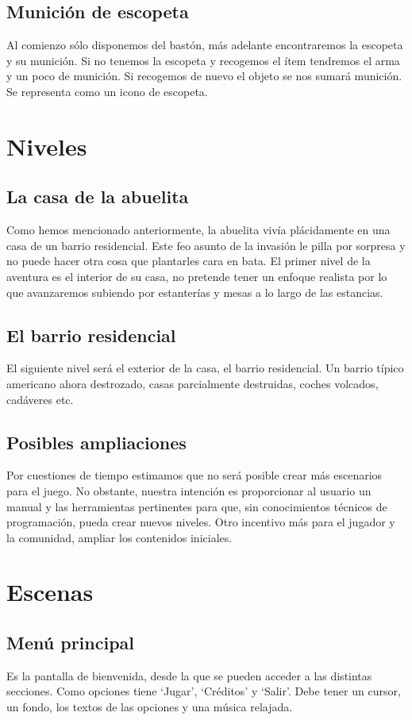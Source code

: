 \documentclass[titlepage]{article}
\begin{document}
\subsection{Munición de escopeta}
Al comienzo sólo disponemos del bastón, más adelante encontraremos la escopeta y su munición. Si no tenemos la escopeta y recogemos el ítem tendremos el arma y un poco de munición. Si recogemos de nuevo el objeto se nos sumará munición. Se representa como un icono de escopeta.

\section{Niveles}

\subsection{La casa de la abuelita}
Como hemos mencionado anteriormente, la abuelita vivía plácidamente en una casa de un barrio residencial. Este feo asunto de la invasión le pilla por sorpresa y no puede hacer otra cosa que plantarles cara en bata. El primer nivel de la aventura es el interior de su casa, no pretende tener un enfoque realista por lo que avanzaremos subiendo por estanterías y mesas a lo largo de las estancias. 

\subsection{El barrio residencial}
El siguiente nivel será el exterior de la casa, el barrio residencial. Un barrio típico americano ahora destrozado, casas parcialmente destruidas, coches volcados, cadáveres etc.

\subsection{Posibles ampliaciones}
Por cuestiones de tiempo estimamos que no será posible crear más escenarios para el juego. No obstante, nuestra intención es proporcionar al usuario un manual y las herramientas pertinentes para que, sin conocimientos técnicos de programación, pueda crear nuevos niveles. Otro incentivo más para el jugador y la comunidad, ampliar los contenidos iniciales.

\section{Escenas}
\subsection{Menú principal}
Es la pantalla de bienvenida, desde la que se pueden acceder a las distintas secciones. Como opciones tiene `Jugar', `Créditos' y `Salir'. Debe tener un cursor, un fondo, los textos de las opciones y una música relajada. 
\end{document}
